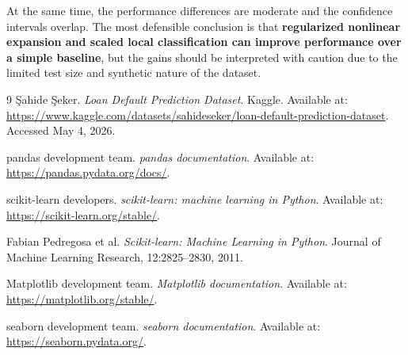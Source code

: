 \documentclass[12pt]{article}
\begin{document}
At the same time, the performance differences are moderate and the confidence intervals overlap. The most defensible conclusion is that \textbf{regularized nonlinear expansion and scaled local classification can improve performance over a simple baseline}, but the gains should be interpreted with caution due to the limited test size and synthetic nature of the dataset.

\begin{thebibliography}{9}
Şahide Şeker. \textit{Loan Default Prediction Dataset}. Kaggle. Available at:
\url{https://www.kaggle.com/datasets/sahideseker/loan-default-prediction-dataset}.
Accessed May 4, 2026.

pandas development team. \textit{pandas documentation}. Available at:
\url{https://pandas.pydata.org/docs/}.

scikit-learn developers. \textit{scikit-learn: machine learning in Python}. Available at:
\url{https://scikit-learn.org/stable/}.

Fabian Pedregosa et al. \textit{Scikit-learn: Machine Learning in Python}. Journal of Machine Learning Research, 12:2825--2830, 2011.

Matplotlib development team. \textit{Matplotlib documentation}. Available at:
\url{https://matplotlib.org/stable/}.

seaborn development team. \textit{seaborn documentation}. Available at:
\url{https://seaborn.pydata.org/}.
\end{thebibliography}
\end{document}
